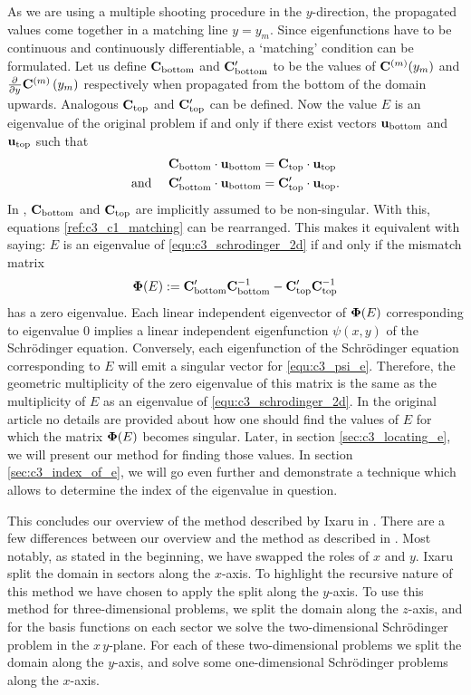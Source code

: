 As we are using a multiple shooting procedure in the $y$-direction, the propagated values come together in a matching line $y = y_m$. Since eigenfunctions have to be continuous and continuously differentiable, a `matching' condition can be formulated.  Let us define $\vb{C}_\text{bottom}$ and $\vb{C}_\text{bottom}'$ to be the values of $\vb{C}^{(m)}(y_m)$ and ${\pdv[]{}{y}}\vb{C}^{(m)}\left(y_m\right)$ respectively when propagated from the bottom of the domain upwards. Analogous $\vb{C}_\text{top}$ and $\vb{C}_\text{top}'$ can be defined. Now the value $E$ is an eigenvalue of the original problem if and only if there exist vectors $\vb{u}_\text{bottom}$ and $\vb{u}_\text{top}$ such that
\begin{align}
  \vb{C}_\text{bottom} \cdot \vb{u}_\text{bottom}                   & = \vb{C}_\text{top} \cdot \vb{u}_\text{top}           \nonumber                  \\
  \text{and }\quad \vb{C}_\text{bottom}' \cdot \vb{u}_\text{bottom} & = \vb{C}_\text{top}' \cdot \vb{u}_\text{top} \text{.} \label{ref:c3_c1_matching}
\end{align}
In \cite{ixaru_new_2010}, $\vb{C}_\text{bottom}$ and $\vb{C}_\text{top}$ are implicitly assumed to be non-singular. With this, equations \eqref{ref:c3_c1_matching} can be rearranged. This makes it equivalent with saying: $E$ is an eigenvalue of \eqref{equ:c3_schrodinger_2d} if and only if the mismatch matrix
\begin{equation}\label{equ:c3_psi_e}
  \vb{\Phi}(E) := \vb{C}_\text{bottom}'\vb{C}_\text{bottom}^{-1} - \vb{C}_\text{top}'\vb{C}_\text{top}^{-1}
\end{equation}
has a zero eigenvalue. Each linear independent eigenvector of $\vb{\Phi}(E)$ corresponding to eigenvalue $0$ implies a linear independent eigenfunction $\psi(x, y)$ of the Schrödinger equation. Conversely, each eigenfunction of the Schrödinger equation corresponding to $E$ will emit a singular vector for \eqref{equ:c3_psi_e}. Therefore, the geometric multiplicity of the zero eigenvalue of this matrix is the same as the multiplicity of $E$ as an eigenvalue of \eqref{equ:c3_schrodinger_2d}. In the original article no details are provided about how one should find the values of $E$ for which the matrix $\vb{\Phi}(E)$ becomes singular. Later, in section \ref{sec:c3_locating_e}, we will present our method for finding those values. In section \ref{sec:c3_index_of_e}, we will go even further and demonstrate a technique which allows to determine the index of the eigenvalue in question.

This concludes our overview of the method described by Ixaru in \cite{ixaru_new_2010}. There are a few differences between our overview and the method as described in \cite{ixaru_new_2010}. Most notably, as stated in the beginning, we have swapped the roles of $x$ and $y$. Ixaru split the domain in sectors along the $x$-axis. To highlight the recursive nature of this method we have chosen to apply the split along the $y$-axis. To use this method for three-dimensional problems, we split the domain along the $z$-axis, and for the basis functions on each sector we solve the two-dimensional Schrödinger problem in the $x\,y$-plane. For each of these two-dimensional problems we split the domain along the $y$-axis, and solve some one-dimensional Schrödinger problems along the $x$-axis.

